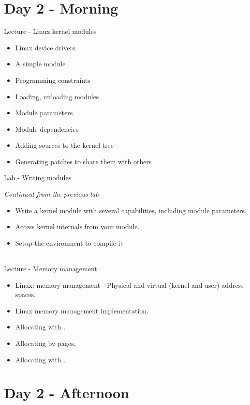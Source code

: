 \documentclass[a4paper,12pt,obeyspaces,spaces,hyphens]{article}
\begin{document}
\section{Day 2 - Morning}

\feagendatwocolumn
{Lecture - Linux kernel modules}
{
  \begin{itemize}
  \item Linux device drivers
  \item A simple module
  \item Programming constraints
  \item Loading, unloading modules
  \item Module parameters
  \item Module dependencies
  \item Adding sources to the kernel tree
  \item Generating patches to share them with others
  \end{itemize}
}
{Lab - Writing modules}
{
  {\em Continued from the previous lab}
  \begin{itemize}
  \item Write a kernel module with several capabilities, including
    module parameters.
  \item Access kernel internals from your module.
  \item Setup the environment to compile it
  \end{itemize}
}
\\
\feagendaonecolumn
{Lecture - Memory management}
{
  \begin{itemize}
  \item Linux: memory management - Physical and virtual (kernel and user) address spaces.
  \item Linux memory management implementation.
  \item Allocating with .
  \item Allocating by pages.
  \item Allocating with .
  \end{itemize}
}

\section{Day 2 - Afternoon}
\end{document}

